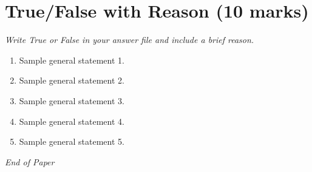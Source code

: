 \documentclass[12pt]{article}
\begin{document}
\section*{True/False with Reason (10 marks)}
\textit{Write True or False in your answer file and include a brief reason.}

\begin{enumerate}[label=\arabic*.]

\item Sample general statement 1.

\item Sample general statement 2.

\item Sample general statement 3.

\item Sample general statement 4.

\item Sample general statement 5.

\end{enumerate}


\vfill
\noindent\textit{End of Paper}
\end{document}

